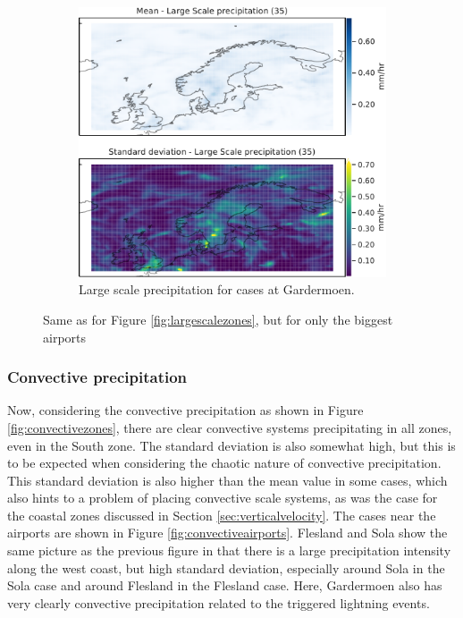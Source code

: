 \begin{figure}
    \begin{subfigure}[b]{0.5\textwidth}
    \centering
    \includegraphics[width=\textwidth]{Figures/lsPENGM.pdf}
    \caption{Large scale precipitation for cases at Gardermoen.}
    \label{fig:ENGMlsP}
\end{subfigure}
\caption{Same as for Figure \ref{fig:largescalezones}, but for only the biggest airports}
\label{fig:largescaleairports}
\end{figure}

\subsubsection{Convective precipitation}
Now, considering the convective precipitation as shown in Figure \ref{fig:convectivezones}, there are clear convective systems precipitating in all zones, even in the South zone. The standard deviation is also somewhat high, but this is to be expected when considering the chaotic nature of convective precipitation. This standard deviation is also higher than the mean value in some cases, which also hints to a problem of placing convective scale systems, as was the case for the coastal zones discussed in Section \ref{sec:verticalvelocity}. The cases near the airports are shown in Figure \ref{fig:convectiveairports}. Flesland and Sola show the same picture as the previous figure in that there is a large precipitation intensity along the west coast, but high standard deviation, especially around Sola in the Sola case and around Flesland in the Flesland case. Here, Gardermoen also has very clearly convective precipitation related to the triggered lightning events. 

